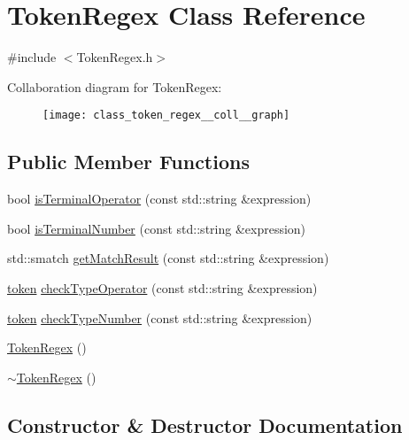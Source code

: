 \hypertarget{class_token_regex}{}\section{Token\+Regex Class Reference}
\label{class_token_regex}


{\ttfamily \#include $<$Token\+Regex.\+h$>$}



Collaboration diagram for Token\+Regex\+:
\nopagebreak
\begin{figure}[H]
\begin{center}
\leavevmode
\texttt{[image: class\_token\_regex\_\_coll\_\_graph]}
\end{center}
\end{figure}
\subsection*{Public Member Functions}
\begin{DoxyCompactItemize}
\item 
bool \mbox{\hyperlink{class_token_regex_a8bd5ea74c521d9f6224b424e6f6e7d61}{is\+Terminal\+Operator}} (const std\+::string \&expression)
\item 
bool \mbox{\hyperlink{class_token_regex_a852aa68c4606f9c9f1bd9350d2e783f0}{is\+Terminal\+Number}} (const std\+::string \&expression)
\item 
std\+::smatch \mbox{\hyperlink{class_token_regex_a65932ff8f3b44a2bd99662208d289d8c}{get\+Match\+Result}} (const std\+::string \&expression)
\item 
\mbox{\hyperlink{structtoken}{token}} \mbox{\hyperlink{class_token_regex_a246e8bd4f285ff2cc7407c9d489c8d37}{check\+Type\+Operator}} (const std\+::string \&expression)
\item 
\mbox{\hyperlink{structtoken}{token}} \mbox{\hyperlink{class_token_regex_ad92e3f32ca477f24839c2f3319bb73aa}{check\+Type\+Number}} (const std\+::string \&expression)
\item 
\mbox{\hyperlink{class_token_regex_a1b6d69a646a074e61f46d7088b50acf8}{Token\+Regex}} ()
\item 
\mbox{\hyperlink{class_token_regex_a2d1a4196e06e8bc43e389a05e63e53c5}{$\sim$\+Token\+Regex}} ()
\end{DoxyCompactItemize}


\subsection{Constructor \& Destructor Documentation}
\mbox{\label{class_token_regex_a1b6d69a646a074e61f46d7088b50acf8}} 
